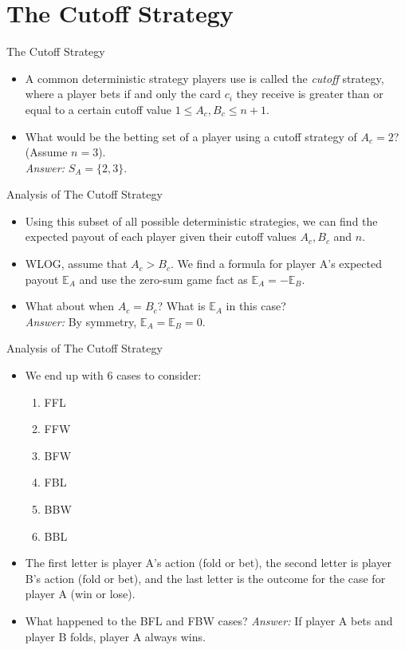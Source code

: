 \documentclass[aspectratio=169]{beamer}
\begin{document}
\section{The Cutoff Strategy}
\frame{\sectionpage}
\begin{frame}{The Cutoff Strategy}
\begin{itemize}
    \item A common deterministic strategy players use is called the \textit{cutoff} strategy, where a player bets if and only the card $c_i$ they receive is greater than or equal to a certain cutoff value $1 \leq A_c,B_c \leq n+1.$ \pause
    \item What would be the betting set of a player using a cutoff strategy of $A_c = 2$? (Assume $n=3$). \pause
    \\ \textit{Answer:} $S_A = \{2,3\}.$
\end{itemize}
\end{frame}
\begin{frame}{Analysis of The Cutoff Strategy}
\begin{itemize}
\item Using this subset of all possible deterministic strategies, we can find the expected payout of each player given their cutoff values $A_c, B_c$ and $n.$ \pause
\item WLOG, assume that $A_c > B_c.$ We find a formula for player A's expected payout $\mathbb{E}_A$ and use the zero-sum game fact as $\mathbb{E}_A = - \mathbb{E}_B.$ \pause
\item What about when $A_c = B_c$? What is $\mathbb{E}_A$ in this case? \pause
\\ \textit{Answer:} By symmetry, $ \mathbb{E}_A = \mathbb{E}_B = 0.$
\end{itemize}
\end{frame}
\begin{frame}{Analysis of The Cutoff Strategy}
\begin{itemize}
\item We end up with 6 cases to consider: 
\begin{enumerate}
        \item FFL
        \item FFW
        \item BFW
        \item FBL
        \item BBW
        \item BBL
    \end{enumerate}
\item The first letter is player A's action (fold or bet), the second letter is player B's action (fold or bet), and the last letter is the outcome for the case for player A (win or lose). \pause
\item What happened to the BFL and FBW cases? \pause
\textit{Answer:} If player A bets and player B folds, player A always wins. 

\end{itemize}
\end{frame}
\end{document}
